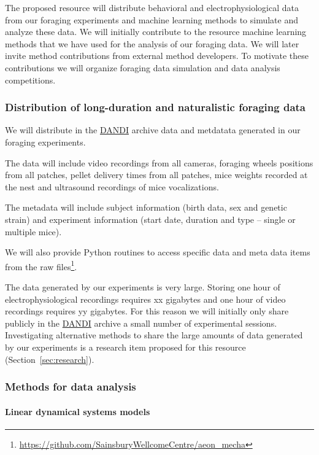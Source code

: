 
The proposed resource will distribute behavioral and electrophysiological data
from our foraging experiments and machine learning methods to simulate and analyze
these data. We will initially contribute to the resource machine learning
methods that we have used for the analysis of our foraging data. We will later
invite method contributions from external method developers. To motivate these
contributions we will organize foraging data simulation and data analysis
competitions.

\subsubsection{Distribution of long-duration and naturalistic foraging data}

We will distribute in the \href{https://dandiarchive.org/}{DANDI} archive data
and metdatata generated in our foraging experiments.

The data will include
video recordings from all cameras,
foraging wheels positions from all patches,
pellet delivery times from all patches,
mice weights recorded at the nest and
ultrasound recordings of mice vocalizations.

The metadata will include
subject information (birth data, sex and genetic strain) and
experiment information (start date, duration and type -- single or multiple
mice).

We will also provide Python routines to access specific data and meta data
items from the raw
files\footnote{\url{https://github.com/SainsburyWellcomeCentre/aeon_mecha}}.

The data generated by our experiments is very large. Storing one hour of
electrophysiological recordings requires xx gigabytes and one hour of video
recordings requires yy gigabytes. For this reason we will initially only share
publicly in the \href{https://dandiarchive.org/}{DANDI} archive a small number
of experimental sessions.
%
Investigating alternative methods to share the large amounts of data generated
by our experiments is a research item proposed for this resource
(Section~\ref{sec:research}).

\subsubsection{Methods for data analysis}

\paragraph{Linear dynamical systems models}

